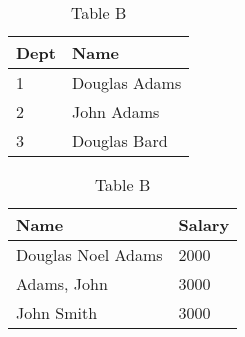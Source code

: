 \begin{table}[!htb]
    \caption{Example of a merge problem}
    \begin{subtable}{.5\linewidth}
      \centering
        \caption{Table A}
        \begin{tabular}{|l|l|}
          \hline
           Dept & Name \\
           \hline
           1    & Douglas Adams \\
           2    & John Adams \\
           3  & Douglas Bard \\
           \hline
        \end{tabular}
    \end{subtable}%
    \begin{subtable}{.5\linewidth}
      \centering
        \caption{Table B}
        \begin{tabular}{|l|l|}
          \hline
           Name & Salary \\
           \hline
           Douglas Noel Adams & 2000 \\
           Adams, John & 3000 \\
           John Smith & 3000 \\
           \hline
        \end{tabular}
    \end{subtable}
    \label{table-example}
\end{table}

